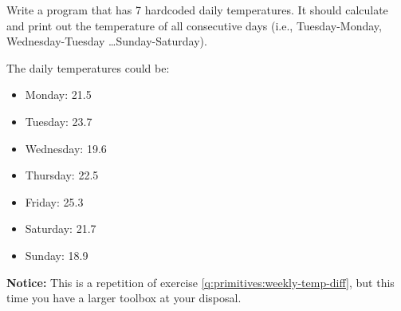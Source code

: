 Write a program that has 7 hardcoded daily temperatures. It should calculate and print out the temperature of all consecutive days (i.e., Tuesday-Monday, Wednesday-Tuesday \ldots Sunday-Saturday).

The daily temperatures could be:

\begin{itemize}
  \item Monday: 21.5
  \item Tuesday: 23.7
  \item Wednesday: 19.6
  \item Thursday: 22.5
  \item Friday: 25.3
  \item Saturday: 21.7
  \item Sunday: 18.9
\end{itemize}

\textbf{Notice:} This is a repetition of exercise \ref{q:primitives:weekly-temp-diff}, but this time you have a larger toolbox at your disposal.
